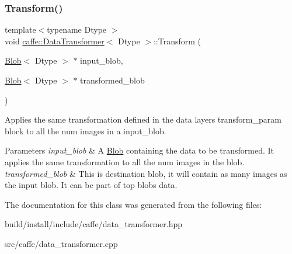 \subsubsection{\texorpdfstring{Transform()}{Transform()}\hspace{0.1cm}{\footnotesize\ttfamily [6/6]}}
{\footnotesize\ttfamily template$<$typename Dtype $>$ \\
void \mbox{\hyperlink{classcaffe_1_1_data_transformer}{caffe\+::\+Data\+Transformer}}$<$ Dtype $>$\+::Transform (\begin{DoxyParamCaption}\item[{\mbox{\hyperlink{classcaffe_1_1_blob}{Blob}}$<$ Dtype $>$ $\ast$}]{input\+\_\+blob,  }\item[{\mbox{\hyperlink{classcaffe_1_1_blob}{Blob}}$<$ Dtype $>$ $\ast$}]{transformed\+\_\+blob }\end{DoxyParamCaption})}



Applies the same transformation defined in the data layer\textquotesingle{}s transform\+\_\+param block to all the num images in a input\+\_\+blob. 


\begin{DoxyParams}{Parameters}
{\em input\+\_\+blob} & A \mbox{\hyperlink{classcaffe_1_1_blob}{Blob}} containing the data to be transformed. It applies the same transformation to all the num images in the blob. \\
\hline
{\em transformed\+\_\+blob} & This is destination blob, it will contain as many images as the input blob. It can be part of top blob\textquotesingle{}s data. \\
\hline
\end{DoxyParams}


The documentation for this class was generated from the following files\+:\begin{DoxyCompactItemize}
\item 
build/install/include/caffe/data\+\_\+transformer.\+hpp\item 
src/caffe/data\+\_\+transformer.\+cpp\end{DoxyCompactItemize}
